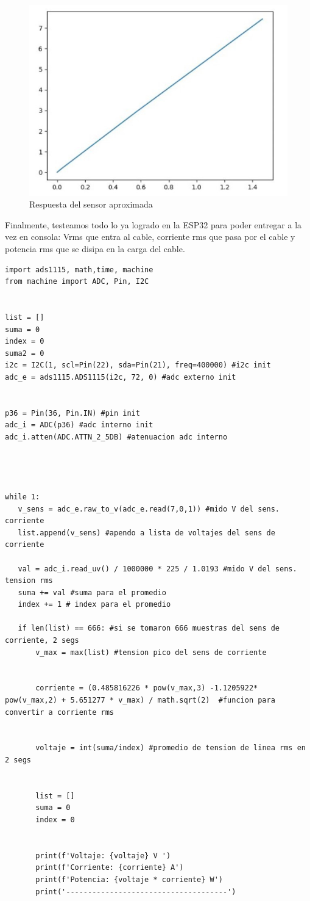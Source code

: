 \begin{figure}[H]
    \centering
    \includegraphics[width=0.75\linewidth]{informes/Screenshot_4.jpg}
    \caption{Respuesta del sensor aproximada}
\end{figure}

Finalmente, testeamos todo lo ya logrado en la ESP32 para poder entregar a la vez en consola: Vrms que entra al cable, corriente rms que pasa por el cable y potencia rms que se disipa en la carga del cable.\\

\begin{listing}[H]
\begin{verbatim}
import ads1115, math,time, machine
from machine import ADC, Pin, I2C


list = []
suma = 0
index = 0
suma2 = 0
i2c = I2C(1, scl=Pin(22), sda=Pin(21), freq=400000) #i2c init
adc_e = ads1115.ADS1115(i2c, 72, 0) #adc externo init


p36 = Pin(36, Pin.IN) #pin init
adc_i = ADC(p36) #adc interno init
adc_i.atten(ADC.ATTN_2_5DB) #atenuacion adc interno




while 1:
   v_sens = adc_e.raw_to_v(adc_e.read(7,0,1)) #mido V del sens. corriente
   list.append(v_sens) #apendo a lista de voltajes del sens de corriente
  
   val = adc_i.read_uv() / 1000000 * 225 / 1.0193 #mido V del sens. tension rms
   suma += val #suma para el promedio
   index += 1 # index para el promedio
  
   if len(list) == 666: #si se tomaron 666 muestras del sens de corriente, 2 segs
       v_max = max(list) #tension pico del sens de corriente


       corriente = (0.485816226 * pow(v_max,3) -1.1205922* pow(v_max,2) + 5.651277 * v_max) / math.sqrt(2)  #funcion para convertir a corriente rms


       voltaje = int(suma/index) #promedio de tension de linea rms en 2 segs


       list = []
       suma = 0
       index = 0


       print(f'Voltaje: {voltaje} V ')
       print(f'Corriente: {corriente} A')
       print(f'Potencia: {voltaje * corriente} W')
       print('-------------------------------------')
\end{verbatim}
\caption{Código con todo implementado}
\label{codigo implementado}
\end{listing}

